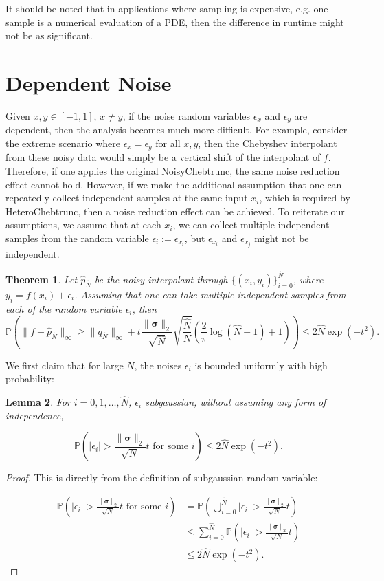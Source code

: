 \documentclass[pdflatex,sn-mathphys-num]{sn-jnl}%
\theoremstyle{thmstyleone}%
\newtheorem{theorem}{Theorem}%
\newtheorem{lemma}[theorem]{Lemma}
\theoremstyle{thmstyletwo}%
\theoremstyle{thmstylethree}%
\begin{document}
It should be noted that in applications where sampling is expensive, e.g. one sample is a numerical evaluation of a PDE, then the difference in runtime might not be as significant. 

\section{Dependent Noise}

Given $x,y \in [-1,1]$, $x\neq y$, if the noise random variables $\epsilon_x$ and $\epsilon_y$ are dependent, then the analysis becomes much more difficult. For example, consider the extreme scenario where $\epsilon_x = \epsilon_y$ for all $x,y$, then the Chebyshev interpolant from these noisy data would simply be a vertical shift of the interpolant of $f$. Therefore, if one applies the original NoisyChebtrunc, the same noise reduction effect cannot hold. However, if we make the additional assumption that one can repeatedly collect independent samples at the same input $x_i$, which is required by HeteroChebtrunc, then a noise reduction effect can be achieved. To reiterate our assumptions, we assume that at each $x_i$, we can collect multiple independent samples from the random variable $\epsilon_{i} := \epsilon_{x_i}$, but $\epsilon_{x_i}$ and $\epsilon_{x_j}$ might not be independent. 

\begin{theorem}
	Let $\hat{p}_{\hat{N}}$ be the noisy interpolant through $\{(x_i, y_i)\}_{i=0}^{\hat{N}}$, where $y_i =f(x_i) + \epsilon_i$. Assuming that one can take multiple independent samples from each of the random variable $\epsilon_{i}$, then \[\mathbb{P}\left(\|f- \hat{p}_{\hat{N}} \|_\infty \geq \|q_{\hat{N}}\|_\infty  + t\frac{\|\bm{\sigma}\|_2}{\sqrt{\hat{N}}}\sqrt{\frac{{\hat{N}}}{N}}(\frac{2}{\pi} \log (\hat{N}+1)+1) \right) \leq  2\hat{N} \exp(-t^2).\]
	
\end{theorem}

We first claim that for large $N$, the noises $\epsilon_i$ is bounded uniformly with high probability:

\begin{lemma}
	For $i =0, 1,\dots, \hat{N}$, $\epsilon_i$ subgaussian, without assuming any form of independence, 
	
	\[\mathbb{P}(|\epsilon_i| > \frac{\|\bm{\sigma}\|_2}{\sqrt{N}} t \text{ for some }i) \leq 2\hat{N} \exp(-t^2) .\]
\end{lemma}

\begin{proof}
	This is directly from the definition of subgaussian random variable:
	
	\begin{align*}
		\mathbb{P}(|\epsilon_i| > \frac{\|\bm{\sigma}\|_2}{\sqrt{N}} t \text{ for some }i) & = \mathbb{P}(\bigcup_{i=0}^{\hat{N}}|\epsilon_i| > \frac{\|\bm{\sigma}\|_2}{\sqrt{N}} t )\\
		&\leq \sum_{i=0}^{\hat{N}} \mathbb{P}(|\epsilon_i| > \frac{\|\bm{\sigma}\|_2}{\sqrt{N}} t )\\
		&\leq 2\hat{N} \exp(-t^2).
	\end{align*}
\end{proof}
\end{document}
